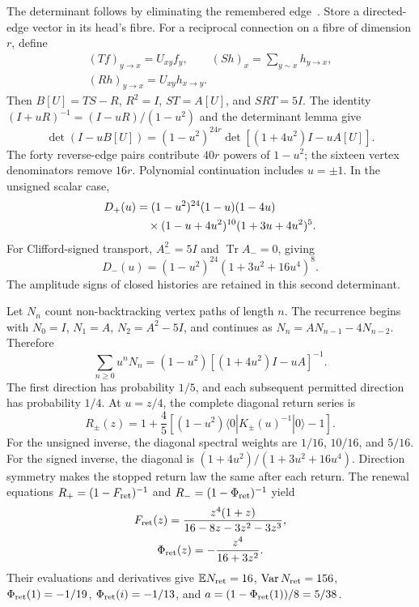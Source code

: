 \documentclass[aps,prx,reprint,longbibliography]{revtex4-2}
\providecommand{\Tr}{\operatorname{Tr}}
\providecommand{\Phis}{\Phi_{\rm ret}}
\providecommand{\Var}{\operatorname{Var}}
\providecommand{\E}{\mathbb E}
\providecommand{\Fret}{F_{\rm ret}}
\begin{document}
The determinant follows by eliminating the remembered edge~\cite{Ihara,Bass,Hashimoto}. Store a directed-edge vector in its head's fibre. For a reciprocal connection on a fibre of dimension $r$, define
\begin{equation}
 \begin{gathered}
 (Tf)_{y\to x}=U_{xy}f_y,\qquad
 (Sh)_x=\sum_{y\sim x}h_{y\to x},\\
 (Rh)_{y\to x}=U_{xy}h_{x\to y}.
 \end{gathered}
 \label{ap:bassmaps}
\end{equation}
Then $B[U]=TS-R$, $R^2=I$, $ST=A[U]$, and $SRT=5I$. The identity $(I+uR)^{-1}=(I-uR)/(1-u^2)$ and the determinant lemma give
\begin{equation}
 \det(I-uB[U])=(1-u^2)^{24r}
 \det[(1+4u^2)I-uA[U]].
 \label{ap:bass}
\end{equation}
The forty reverse-edge pairs contribute $40r$ powers of $1-u^2$; the sixteen vertex denominators remove $16r$. Polynomial continuation includes $u=\pm1$. In the unsigned scalar case,
\begin{align}
 D_+(u)&=(1-u^2)^{24}(1-u)(1-4u)\notag\\
 &\quad\times(1-u+4u^2)^{10}(1+3u+4u^2)^5.
 \label{ap:unsigneddet}
\end{align}
For Clifford-signed transport, $A_-^2=5I$ and $\Tr A_-=0$, giving
\begin{equation}
 D_-(u)=(1-u^2)^{24}(1+3u^2+16u^4)^8.
 \label{ap:signeddet}
\end{equation}
The amplitude signs of closed histories are retained in this second determinant.

Let $N_n$ count non-backtracking vertex paths of length $n$. The recurrence begins with $N_0=I$, $N_1=A$, $N_2=A^2-5I$, and continues as $N_n=AN_{n-1}-4N_{n-2}$. Therefore
\begin{equation}
 \sum_{n\geq0}u^nN_n=(1-u^2)[(1+4u^2)I-uA]^{-1}.
 \label{ap:pathsum}
\end{equation}
The first direction has probability $1/5$, and each subsequent permitted direction has probability $1/4$. At $u=z/4$, the complete diagonal return series is
\begin{equation}
 R_\pm(z)=1+\frac45\left[(1-u^2)\langle0|K_\pm(u)^{-1}|0\rangle-1\right].
 \label{ap:returnseries}
\end{equation}
For the unsigned inverse, the diagonal spectral weights are $1/16$, $10/16$, and $5/16$. For the signed inverse, the diagonal is $(1+4u^2)/(1+3u^2+16u^4)$. Direction symmetry makes the stopped return law the same after each return. The renewal equations $R_+=(1-\Fret)^{-1}$ and $R_-=(1-\Phis)^{-1}$ yield
\begin{equation}
\begin{gathered}
 \Fret(z)=\frac{z^4(1+z)}{16-8z-3z^2-3z^3},\\
 \Phis(z)=-\frac{z^4}{16+3z^2}.
 \end{gathered}
 \label{ap:firstreturns}
\end{equation}
Their evaluations and derivatives give $\E N_{\rm ret}=16$, $\Var N_{\rm ret}=156$, $\Phis(1)=-1/19$, $\Phis(i)=-1/13$, and $a=(1-\Phis(1))/8=5/38$.
\end{document}
